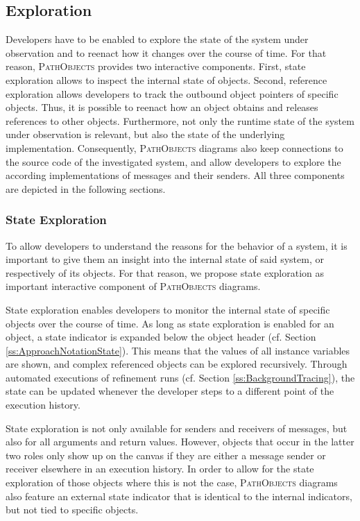 \subsection{Exploration}
\label{ss:ApproachInteractiveExploration}
Developers have to be enabled to explore the state of the system under observation and to reenact how it changes over the course of time.
For that reason, \textsc{PathObjects} provides two interactive components.
First, state exploration allows to inspect the internal state of objects.
Second, reference exploration allows developers to track the outbound object pointers of specific objects.
Thus, it is possible to reenact how an object obtains and releases references to other objects.
Furthermore, not only the runtime state of the system under observation is relevant, but also the state of the underlying implementation.
Consequently, \textsc{PathObjects} diagrams also keep connections to the source code of the investigated system, and allow developers to explore the according implementations of messages and their senders.
All three components are depicted in the following sections.

\subsubsection{State Exploration}
To allow developers to understand the reasons for the behavior of a system, it is important to give them an insight into the internal state of said system, or respectively of its objects.
For that reason, we propose state exploration as important interactive component of \textsc{PathObjects} diagrams.

State exploration enables developers to monitor the internal state of specific objects over the course of time.
As long as state exploration is enabled for an object, a state indicator is expanded below the object header (cf. Section \ref{ss:ApproachNotationState}).
This means that the values of all instance variables are shown, and complex referenced objects can be explored recursively.
Through automated executions of refinement runs (cf. Section \ref{ss:BackgroundTracing}), the state can be updated whenever the developer steps to a different point of the execution history.

State exploration is not only available for senders and receivers of messages, but also for all arguments and return values.
However, objects that occur in the latter two roles only show up on the canvas if they are either a message sender or receiver elsewhere in an execution history. 
In order to allow for the state exploration of those objects where this is not the case, \textsc{PathObjects} diagrams also feature an external state indicator that is identical to the internal indicators, but not tied to specific objects.

